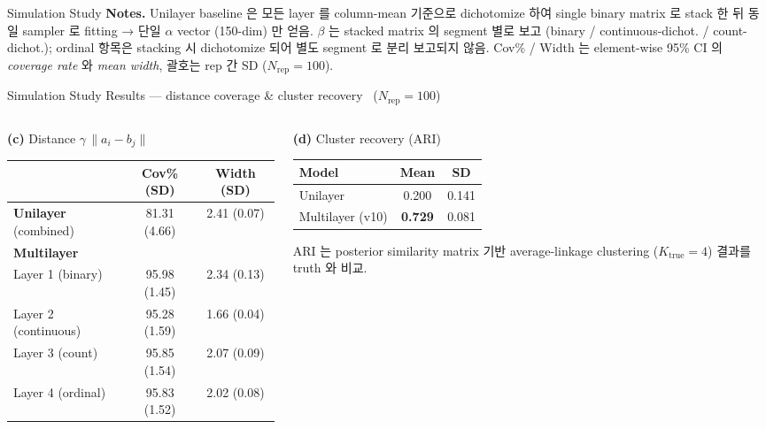 \documentclass{beamer}
\begin{document}
\begin{frame}{Simulation Study}
\vspace{2pt}
{\tiny
\textbf{Notes.} Unilayer baseline 은 모든 layer 를 column-mean 기준으로 dichotomize 하여 single binary matrix 로 stack 한 뒤 동일 sampler 로 fitting → 단일 $\alpha$ vector (150-dim) 만 얻음. $\beta$ 는 stacked matrix 의 segment 별로 보고 (binary / continuous-dichot. / count-dichot.); ordinal 항목은 stacking 시 dichotomize 되어 별도 segment 로 분리 보고되지 않음. Cov\% / Width 는 element-wise 95\% CI 의 \emph{coverage rate} 와 \emph{mean width}, 괄호는 rep 간 SD ($N_{\mathrm{rep}}=100$).
}
\end{frame}

\begin{frame}{Simulation Study}
{Results --- distance coverage \& cluster recovery \ ($N_{\mathrm{rep}}=100$)}

\begin{columns}[T]
\begin{column}{0.55\textwidth}
\centering
\textbf{(c)} Distance $\gamma\,\lVert a_i - b_j\rVert$\\[2pt]
{\scriptsize
\setlength{\tabcolsep}{3pt}
\renewcommand{\arraystretch}{1.05}
\begin{tabular}{l cc}
\toprule
 & Cov\% (SD) & Width (SD) \\
\midrule
\textbf{Unilayer} (combined)    & 81.31 (4.66) & 2.41 (0.07) \\
\midrule
\textbf{Multilayer}             &              &              \\
\;Layer 1 (binary)              & 95.98 (1.45) & 2.34 (0.13) \\
\;Layer 2 (continuous)          & 95.28 (1.59) & 1.66 (0.04) \\
\;Layer 3 (count)               & 95.85 (1.54) & 2.07 (0.09) \\
\;Layer 4 (ordinal)             & 95.83 (1.52) & 2.02 (0.08) \\
\bottomrule
\end{tabular}
}
\end{column}

\begin{column}{0.45\textwidth}
\centering
\textbf{(d)} Cluster recovery (ARI)\\[2pt]
{\scriptsize
\setlength{\tabcolsep}{6pt}
\renewcommand{\arraystretch}{1.15}
\begin{tabular}{l cc}
\toprule
Model & Mean & SD \\
\midrule
Unilayer        & 0.200             & 0.141 \\
Multilayer (v10)& \textbf{0.729}    & 0.081 \\
\bottomrule
\end{tabular}
}
\vspace{4pt}
{\tiny
ARI 는 posterior similarity matrix 기반 average-linkage clustering ($K_{\mathrm{true}}=4$) 결과를 truth 와 비교.
}
\end{column}
\end{columns}


\end{frame}
\end{document}
